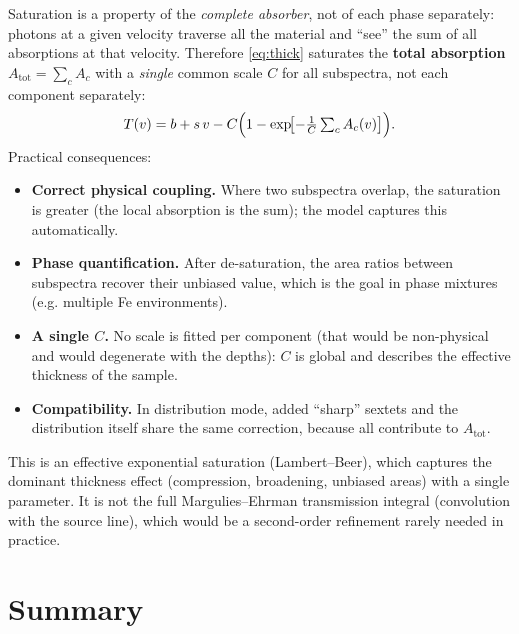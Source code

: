 \documentclass[11pt,a4paper]{article}
\begin{document}
Saturation is a property of the \emph{complete absorber}, not of each phase
separately: photons at a given velocity traverse all the material and ``see''
the sum of all absorptions at that velocity. Therefore \eqref{eq:thick} saturates
the \textbf{total absorption} $A_{\text{tot}}=\sum_c A_c$ with a \emph{single}
common scale $C$ for all subspectra, not each component separately:
\begin{equation}
  T(v) = b + s\,v - C\Bigl(1 - \exp\!\bigl[-\tfrac{1}{C}\textstyle\sum_c A_c(v)\bigr]\Bigr).
\end{equation}
Practical consequences:
\begin{itemize}[leftmargin=*]
  \item \textbf{Correct physical coupling.} Where two subspectra overlap, the
        saturation is greater (the local absorption is the sum); the model
        captures this automatically.
  \item \textbf{Phase quantification.} After de-saturation, the area ratios
        between subspectra recover their unbiased value, which is the goal in
        phase mixtures (e.g. multiple Fe environments).
  \item \textbf{A single $C$.} No scale is fitted per component (that would be
        non-physical and would degenerate with the depths): $C$ is global and
        describes the effective thickness of the sample.
  \item \textbf{Compatibility.} In distribution mode, added ``sharp'' sextets
        and the distribution itself share the same correction, because all
        contribute to $A_{\text{tot}}$.
\end{itemize}

\begin{nota}
This is an effective exponential saturation (Lambert--Beer), which captures the
dominant thickness effect (compression, broadening, unbiased areas) with a single
parameter. It is not the full Margulies--Ehrman transmission integral (convolution
with the source line), which would be a second-order refinement rarely needed in
practice.
\end{nota}

\section{Summary}
\end{document}
